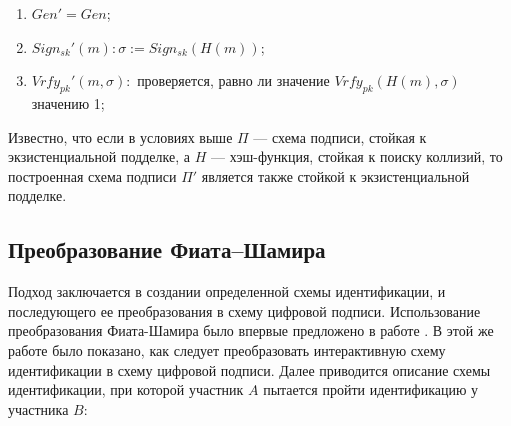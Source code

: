 \documentclass{./civarticle}
\begin{document}
\begin{enumerate}
    \item $Gen' = Gen$;
    \item $Sign_{sk}'(m): \sigma := Sign_{sk}(H(m))$;
    \item $Vrfy_{pk}'(m, \sigma):$ проверяется, равно ли значение $ Vrfy_{pk}(H(m), \sigma)$ значению 1;
\end{enumerate}

Известно, что если в условиях выше $\Pi$ --- схема подписи, стойкая к экзистенциальной подделке, а $H$ --- хэш-функция, стойкая к поиску коллизий, то построенная схема подписи $\Pi'$ является также стойкой к экзистенциальной подделке.

\subsection{Преобразование Фиата–Шамира}

Подход заключается в создании определенной схемы идентификации, и последующего ее преобразования в схему цифровой подписи. Использование преобразования Фиата-Шамира было впервые предложено в работе \cite{fiat-shamir}. В этой же работе было показано, как следует преобразовать интерактивную схему идентификации в схему цифровой подписи. Далее приводится описание схемы идентификации, при которой участник $A$ пытается пройти идентификацию у участника $B$:
\end{document}
